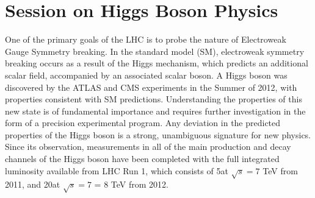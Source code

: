 \section{Session on Higgs Boson Physics}\label{higgs}


One of the primary goals of the LHC is to probe the nature of Electroweak Gauge 
Symmetry breaking. In the standard model (SM), electroweak symmetry
breaking occurs as a result of the Higgs mechanism, which predicts an
additional scalar field, accompanied by an associated scalar boson. A
Higgs boson was discovered by the ATLAS and CMS experiments in the
Summer of 2012, with properties consistent with SM predictions.
Understanding the properties of this new state is of fundamental
importance and requires further investigation in the form of a precision
experimental program. Any deviation in the predicted properties of the
Higgs boson is a strong, unambiguous signature for new physics. Since
its observation, measurements in all of the main production and decay
channels of the Higgs boson have been completed with the full integrated
luminosity available from LHC Run 1, which consists of 5\fb  at $\sqrt{s} = 7$
TeV from 2011, and 20\fb at  $\sqrt{s} = 7$ = 8 TeV from 2012. 

